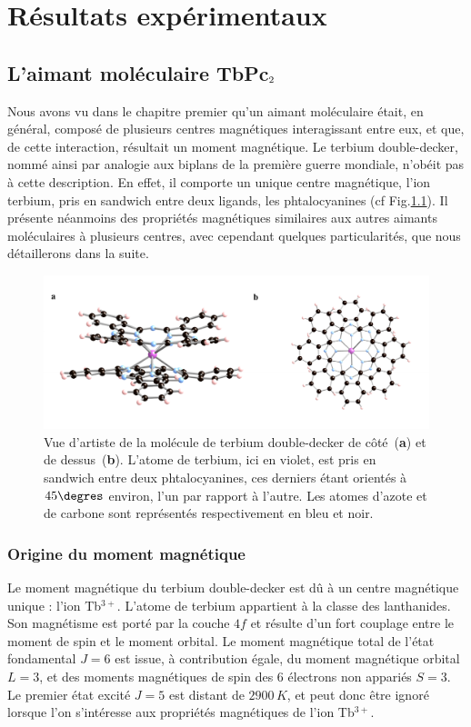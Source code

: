 \chapter{Résultats expérimentaux}

\section{L'aimant moléculaire TbPc$_{\rm{2}}$}
Nous avons vu dans le chapitre premier qu'un aimant moléculaire était, en général, composé de plusieurs centres magnétiques interagissant entre eux, et que, de cette interaction, résultait un moment magnétique. Le terbium double-decker, nommé ainsi par analogie aux biplans de la première guerre mondiale, n’obéit pas à cette description. En effet, il comporte un unique centre magnétique, l'ion terbium, pris en sandwich entre deux ligands, les phtalocyanines (cf Fig.\ref{TbPc2Imag}). Il présente néanmoins des propriétés magnétiques similaires aux autres aimants moléculaires à plusieurs centres, avec cependant quelques particularités, que nous détaillerons dans la suite.

\begin{figure}
\centering \includegraphics[scale=0.45]{Resultats/TbPc2Imag/TbPc2Imag.pdf} 
\caption{Vue d'artiste de la molécule de terbium double-decker de côté~(\textbf{a}) et de dessus~(\textbf{b}). L'atome de terbium, ici en violet, est pris en sandwich entre deux phtalocyanines, ces derniers étant orientés à $45\degres$ environ, l'un par rapport à l'autre. Les atomes d'azote et de carbone sont représentés respectivement en bleu et noir.}
\label{TbPc2Imag}
\end{figure}





\subsection{Origine du moment magnétique}
Le moment magnétique du terbium double-decker est d\^u à un centre magnétique unique : l'ion Tb$^{3+}$. L'atome de terbium appartient à la classe des lanthanides. Son magnétisme est porté par la couche $4f$ et résulte d'un fort couplage entre le moment de spin et le moment orbital. Le moment magnétique total de l'état fondamental $J=6$ est issue, à contribution égale, du moment magnétique orbital $L=3$, et des moments magnétiques de spin des 6 électrons non appariés $S=3$. Le premier état excité $J=5$ est distant de $2900\,K$, et peut donc \^etre ignoré lorsque l'on s'intéresse aux propriétés magnétiques de l'ion Tb$^{3+}$.
 

